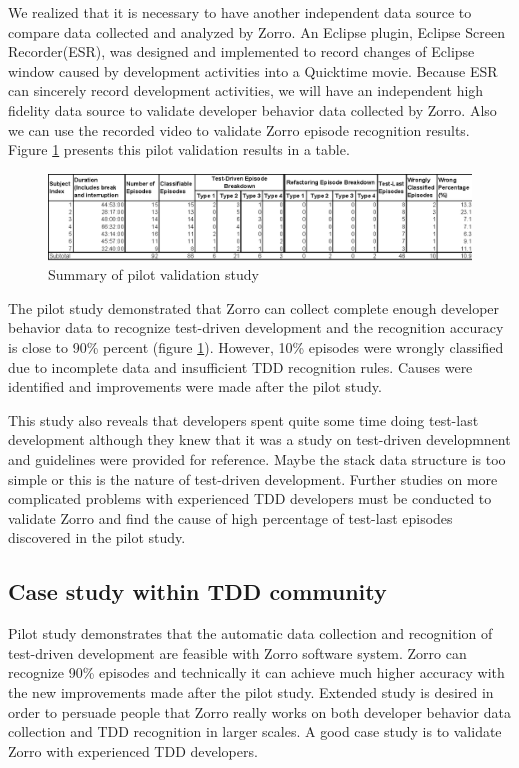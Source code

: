We realized that it is necessary to have another independent data source to
compare data collected and analyzed by Zorro. An Eclipse plugin, Eclipse
Screen Recorder(ESR), was designed and implemented to record changes of
Eclipse window caused by development activities into a Quicktime
movie\cite{csdl2-06-02}. Because ESR can sincerely record development
activities, we will have an independent high fidelity data source to
validate developer behavior data collected by Zorro. Also we can use the
recorded video to validate Zorro episode recognition results. Figure
\ref{fig:PilotSummary} presents this pilot validation results in a table.
\begin{figure}[htbp] 
  \centering
  \includegraphics{figs/Pilot-Summary.eps}
  \caption{Summary of pilot validation study}\label{fig:PilotSummary}
\end{figure}
 
The pilot study demonstrated that Zorro can collect complete enough
developer behavior data to recognize test-driven development and the
recognition accuracy is close to 90\% percent (figure
\ref{fig:PilotSummary}). However, 10\% episodes were wrongly classified due
to incomplete data and insufficient TDD recognition rules. Causes were
identified and improvements were made after the pilot study.

This study also reveals that developers spent quite some time doing
test-last development although they knew that it was a study on test-driven
developmnent and guidelines were provided for reference. Maybe the stack
data structure is too simple or this is the nature of test-driven
development. Further studies on more complicated problems with experienced
TDD developers must be conducted to validate Zorro and find the cause of
high percentage of test-last episodes discovered in the pilot study.

\subsection{Case study within TDD community}
Pilot study demonstrates that the automatic data collection and recognition
of test-driven development are feasible with Zorro software system. Zorro
can recognize 90\% episodes and technically it can achieve much higher
accuracy with the new improvements made after the pilot study. Extended
study is desired in order to persuade people that Zorro really works on
both developer behavior data collection and TDD recognition in larger
scales. A good case study is to validate Zorro with experienced TDD
developers.

